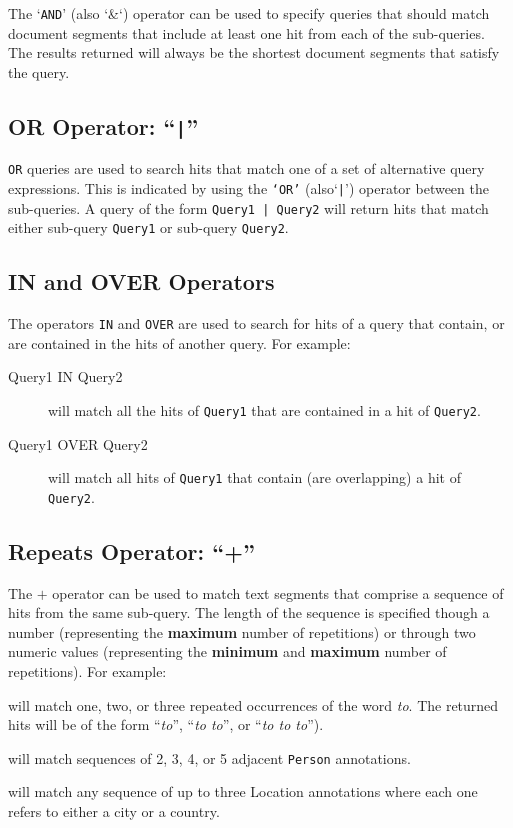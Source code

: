 The `{\tt AND}' (also `\&`) operator can be used to specify queries that should
match document segments that include at least one hit from each of the
sub-queries. The results returned will always be the shortest document segments
that satisfy the query.

\subsection{OR Operator: ``{\tt |}''}\label{sec:or-query}

{\tt OR} queries are used to search hits that match one of a set of alternative
query expressions. This is indicated by using the {\tt `OR'} (also`\verb!|!')
operator between the sub-queries. A query of the form {\tt Query1 | Query2} will
return hits that match either sub-query {\tt Query1} or sub-query {\tt Query2}.

\subsection{IN and OVER Operators}\label{sec:containment-query}

The operators {\tt IN} and {\tt OVER} are used to search for hits of a query
that contain, or are contained in the hits of another query. For example:
\begin{description}
\item[Query1 IN Query2] will match all the hits of {\tt Query1} that are
contained in a hit of {\tt Query2}.
\item[Query1 OVER Query2] will match all hits of {\tt Query1} that contain (are
overlapping) a hit of {\tt Query2}.
\end{description}

\subsection{Repeats Operator: ``+''}\label{sec:kleene-query}

The $+$ operator can be used to match text segments that comprise a sequence of
hits from the same sub-query. The length of the sequence is specified though a
number (representing the {\bf maximum} number of repetitions) or through two
numeric values (representing the {\bf minimum} and {\bf maximum} number of
repetitions). For example:
\bde
  \item[{\tt to+3}] will match one, two, or three repeated occurrences of the
  word {\it to}. The returned hits will be of the form ``{\it to}'', ``{\it to  
  to}'', or ``{\it to to to}'').
  \item[{\tt \{Person\}+2..5}] will match sequences of 2, 3, 4, or 5
  adjacent {\tt Person} annotations.
  \item[{\tt (\{Location locType = city\} |
  \{Location locType = country\})+3}] will match any sequence of up to
  three Location annotations where each one refers to either a city or a
  country.
\ede

